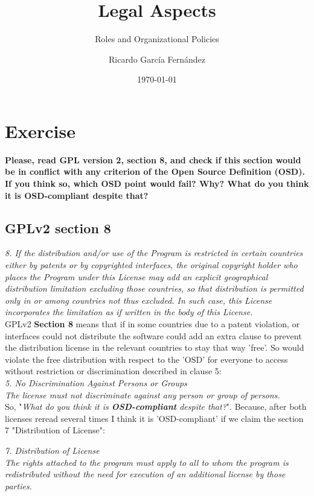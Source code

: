 \documentclass[11pt]{scrartcl}
\title{\textbf{Legal Aspects}}
\subtitle{Roles and Organizational Policies}
\author{Ricardo García Fernández}
\date{\today}
\begin{document}
\maketitle

\section{Exercise}

\textbf{Please, read GPL version 2, section 8, and check if this section would be in conflict with any criterion of the Open Source Definition (OSD). If you think so, which OSD point would fail? Why? What do you think it is OSD-compliant despite that?}\\

\subsection{GPLv2 section 8}

\emph{8. If the distribution and/or use of the Program is restricted in certain countries either by patents or by copyrighted interfaces, the original copyright holder who places the Program under this License may add an explicit geographical distribution limitation excluding those countries, so that distribution is permitted only in or among countries not thus excluded. In such case, this License incorporates the limitation as if written in the body of this License.}\\

GPLv2 \textbf{Section 8} means that if in some countries due to a patent violation, or interfaces could not distribute the software could add an extra clause to prevent the distribution license in the relevant countries to stay that way 'free'. So would violate the free distribution with respect to the 'OSD' for everyone to access without restriction or discrimination described in clause 5:\\

\emph{5. No Discrimination Against Persons or Groups\\
The license must not discriminate against any person or group of persons.}\\

So, "\emph{What do you think it is \textbf{OSD-compliant} despite that?}". Because, after both licenses reread several times I think it is 'OSD-compliant' if we claim the section 7 "Distribution of License":

\emph{7. Distribution of License\\
The rights attached to the program must apply to all to whom the program is redistributed without the need for execution of an additional license by those parties.}
\end{document}
